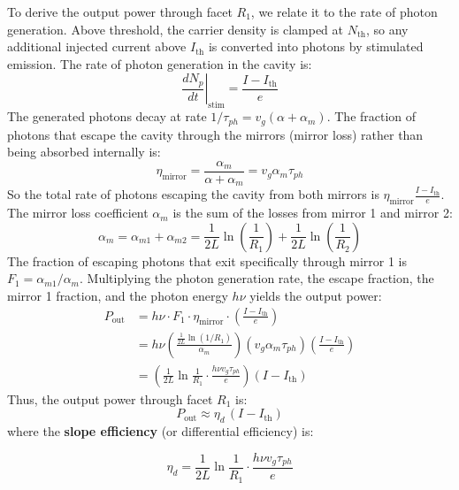 To derive the output power through facet $R_1$, we relate it to the rate of photon generation. Above threshold, the carrier density is clamped at $N_\text{th}$, so any additional injected current above $I_\text{th}$ is converted into photons by stimulated emission. The rate of photon generation in the cavity is:
\begin{equation*}
    \left.\frac{d N_p}{dt}\right|_\text{stim} = \frac{I - I_\text{th}}{e}
\end{equation*}
The generated photons decay at rate $1/\tau_{ph} = v_g(\alpha + \alpha_m)$. The fraction of photons that escape the cavity through the mirrors (mirror loss) rather than being absorbed internally is:
\begin{equation*}
    \eta_\text{mirror} = \frac{\alpha_m}{\alpha + \alpha_m} = v_g \alpha_m \tau_{ph}
\end{equation*}
So the total rate of photons escaping the cavity from both mirrors is $\eta_\text{mirror} \frac{I - I_\text{th}}{e}$. The mirror loss coefficient $\alpha_m$ is the sum of the losses from mirror 1 and mirror 2:
\begin{equation*}
    \alpha_m = \alpha_{m1} + \alpha_{m2} = \frac{1}{2L}\ln\!\left(\frac{1}{R_1}\right) + \frac{1}{2L}\ln\!\left(\frac{1}{R_2}\right)
\end{equation*}
The fraction of escaping photons that exit specifically through mirror 1 is $F_1 = \alpha_{m1}/\alpha_m$. Multiplying the photon generation rate, the escape fraction, the mirror 1 fraction, and the photon energy $h\nu$ yields the output power:
\begin{align*}
    P_\text{out} &= h\nu \cdot F_1 \cdot \eta_\text{mirror} \cdot \left(\frac{I - I_\text{th}}{e}\right) \\
    &= h\nu \left( \frac{\frac{1}{2L}\ln(1/R_1)}{\alpha_m} \right) (v_g \alpha_m \tau_{ph}) \left(\frac{I - I_\text{th}}{e}\right) \\
    &= \left( \frac{1}{2L}\ln\!\frac{1}{R_1} \cdot \frac{h\nu v_g \tau_{ph}}{e} \right) (I - I_\text{th})
\end{align*}
Thus, the output power through facet $R_1$ is:
\begin{equation*}
    P_\text{out} \approx \eta_d\,(I - I_\text{th})
\end{equation*}
where the \textbf{slope efficiency} (or differential efficiency) is:
\begin{keyresult}
    \begin{equation}
        \eta_d = \frac{1}{2L}\ln\!\frac{1}{R_1}\cdot\frac{h\nu v_g \tau_{ph}}{e}
    \end{equation}
\end{keyresult}

